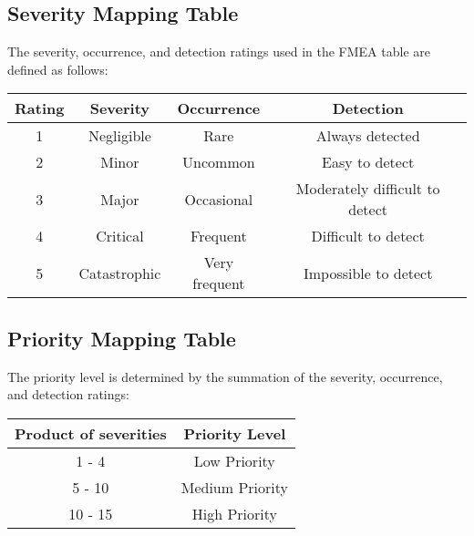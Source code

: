 \documentclass{article}
\begin{document}
\subsection{Severity Mapping Table}
The severity, occurrence, and detection ratings used in the FMEA table are defined as follows:
\begin{table}[H]
\begin{tabular}{c|c|c|c}

    Rating & Severity & Occurrence & Detection \\\hline
    1 & Negligible & Rare & Always detected \\\hline
    2 & Minor & Uncommon & Easy to detect \\ \hline
    3 & Major & Occasional & Moderately difficult to detect \\\hline
    4 & Critical & Frequent & Difficult to detect \\\hline
    5 & Catastrophic & Very frequent & Impossible to detect \\


\end{tabular}
\end{table}

\subsection{Priority Mapping Table}

The priority level is determined by the summation of the severity, occurrence,
and detection ratings:

\begin{table}[H]
    \begin{tabular}{c|c}
        Product of severities & Priority Level \\\hline
        1 - 4 & Low Priority \\\hline
        5 - 10 & Medium Priority \\\hline
        10 - 15 & High Priority \\

    \end{tabular}
\end{table}

\newpage
\pdfpagewidth=15in
\pdfpageheight=11.5in
\end{document}
